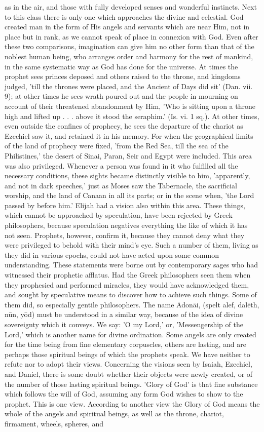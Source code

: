 \documentclass[12pt]{article}
\begin{document}
as in the air, and those with fully developed senses and wonderful instincts. Next to this class there is only one which approaches the divine and celestial. God created man in the form of His angels and servants which are near Him, not in place but in rank, as we cannot speak of place in connexion with God. Even after these two comparisons, imagination can give him no other form than that of the noblest human being, who arranges order and harmony for the rest of mankind, in the same systematic way as God has done for the universe. At times the prophet sees princes deposed and others raised to the throne, and kingdoms judged, 'till the thrones were placed, and the Ancient of Days did sit' (Dan. vii. 9); at other times he sees wrath poured out and the people in mourning on account of their threatened abandonment by Him, 'Who is sitting upon a throne high and lifted up . . . above it stood the seraphim.' (Is. vi. 1 sq.). At other times, even outside the confines of prophecy, he sees the departure of the chariot as Ezechiel saw it, and retained it in his memory. For when the geographical limits of the land of prophecy were fixed, 'from the Red Sea, till the sea of the Philistines,' the desert of Sinai, Paran, Seir and Egypt were included. This area was also privileged. Whenever a person was found in it who fulfilled all the necessary conditions, these sights became distinctly visible to him, 'apparently, and not in dark speeches,' just as Moses saw the Tabernacle, the sacrificial worship, and the land of Canaan in all its parts; or in the scene when, 'the Lord passed by before him.' Elijah had a vision also within this area. These things, which cannot be approached by speculation, have been rejected by Greek philosophers, because speculation negatives everything the like of which it has not seen. Prophets, however, confirm it, because they cannot deny what they were privileged to behold with their mind's eye. Such a number of them, living as they did in various epochs, could not have acted upon some common understanding. These statements were borne out by contemporary sages who had witnessed their prophetic afflatus. Had the Greek philosophers seen them when they prophesied and performed miracles, they would have acknowledged them, and sought by speculative means to discover how to achieve such things. Some of them did, so especially gentile philosophers. The name Adonāi, (spelt alef, dalēth, nūn, yōd) must be understood in a similar way, because of the idea of divine sovereignty which it conveys. We say: 'O my Lord,' or, 'Messengership of the Lord,' which is another name for divine ordination. Some angels are only created for the time being from fine elementary corpuscles, others are lasting, and are perhaps those spiritual beings of which the prophets speak. We have neither to refute nor to adopt their views. Concerning the visions seen by Isaiah, Ezechiel, and Daniel, there is some doubt whether their objects were newly created, or of the number of those lasting spiritual beings. 'Glory of God' is that fine substance which follows the will of God, assuming any form God wishes to show to the prophet. This is one view. According to another view the Glory of God means the whole of the angels and spiritual beings, as well as the throne, chariot, firmament, wheels, spheres, and 
\end{document}
